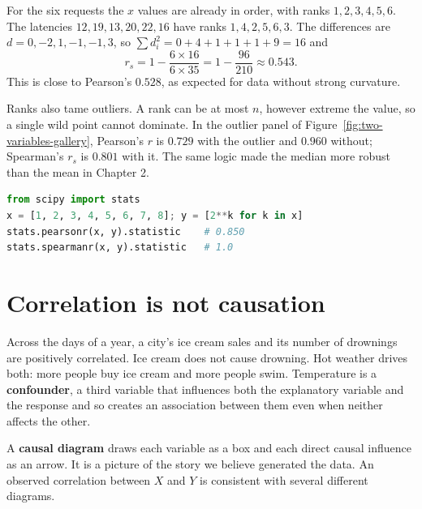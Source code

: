 \begin{example}
For the six requests the $x$ values are already in order, with ranks
$1,2,3,4,5,6$. The latencies $12, 19, 13, 20, 22, 16$ have ranks $1, 4, 2, 5, 6, 3$.
The differences are $d = 0, -2, 1, -1, -1, 3$, so $\sum d_i^2 = 0+4+1+1+1+9 = 16$
and
\[
  r_s = 1 - \frac{6 \times 16}{6 \times 35} = 1 - \frac{96}{210} \approx 0.543 .
\]
This is close to Pearson's $0.528$, as expected for data without strong curvature.
\end{example}

Ranks also tame outliers. A rank can be at most $n$, however extreme the value, so a
single wild point cannot dominate. In the outlier panel of
Figure~\ref{fig:two-variables-gallery}, Pearson's $r$ is $0.729$ with the outlier
and $0.960$ without; Spearman's $r_s$ is $0.801$ with it. The same logic made the
median more robust than the mean in Chapter 2.

\begin{lstlisting}[language=Python]
from scipy import stats
x = [1, 2, 3, 4, 5, 6, 7, 8]; y = [2**k for k in x]
stats.pearsonr(x, y).statistic    # 0.850
stats.spearmanr(x, y).statistic   # 1.0
\end{lstlisting}

\section{Correlation is not causation}
\label{sec:corr-causation}

Across the days of a year, a city's ice cream sales and its number of drownings are
positively correlated. Ice cream does not cause drowning. Hot weather drives both:
more people buy ice cream and more people swim. Temperature is a
\textbf{confounder}, a third variable that influences both the explanatory variable
and the response and so creates an association between them even when neither
affects the other.

A \textbf{causal diagram} draws each variable as a box and each direct causal
influence as an arrow. It is a picture of the story we believe generated the data.
An observed correlation between $X$ and $Y$ is consistent with several different
diagrams.

